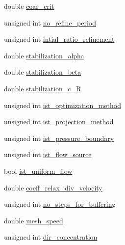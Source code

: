 \begin{DoxyCompactItemize}
\item 
double \hyperlink{struct_u_b_c__mis__mixing_1_1_parameters_aa269a4c7cf042c8ea3c2dd30d865a4dd}{coar\+\_\+crit}
\item 
unsigned int \hyperlink{struct_u_b_c__mis__mixing_1_1_parameters_a88702f3fc3a89e9e88bc06f8d5b2596f}{no\+\_\+refine\+\_\+period}
\item 
unsigned int \hyperlink{struct_u_b_c__mis__mixing_1_1_parameters_ac7af864aa24d111da0e46d45278950b0}{intial\+\_\+ratio\+\_\+refinement}
\item 
double \hyperlink{struct_u_b_c__mis__mixing_1_1_parameters_ad4e626698deb1d2d1e17d25ffade6433}{stabilization\+\_\+alpha}
\item 
double \hyperlink{struct_u_b_c__mis__mixing_1_1_parameters_aa88c59c293b2b4d7668c4ddaf48de937}{stabilization\+\_\+beta}
\item 
double \hyperlink{struct_u_b_c__mis__mixing_1_1_parameters_ab8699b436648320743f2d1601fa5fc1d}{stabilization\+\_\+c\+\_\+\+R}
\item 
unsigned int \hyperlink{struct_u_b_c__mis__mixing_1_1_parameters_ae719108e305df5ee2b950e8d058ccd89}{ist\+\_\+optimization\+\_\+method}
\item 
unsigned int \hyperlink{struct_u_b_c__mis__mixing_1_1_parameters_a621dda8ef2f8b914fc76b16da67d4869}{ist\+\_\+projection\+\_\+method}
\item 
unsigned int \hyperlink{struct_u_b_c__mis__mixing_1_1_parameters_ad7f05e11567b4ffcca1ab6d6d25e93cd}{ist\+\_\+pressure\+\_\+boundary}
\item 
unsigned int \hyperlink{struct_u_b_c__mis__mixing_1_1_parameters_a37b3342d98b8bc3b829a87981d2dc333}{ist\+\_\+flow\+\_\+source}
\item 
bool \hyperlink{struct_u_b_c__mis__mixing_1_1_parameters_a04908c7866d4e382771eef213f59ff4b}{ist\+\_\+uniform\+\_\+flow}
\item 
double \hyperlink{struct_u_b_c__mis__mixing_1_1_parameters_a856a4cd5f9549dda9bb66c0b8ac48a9e}{coeff\+\_\+relax\+\_\+div\+\_\+velocity}
\item 
unsigned int \hyperlink{struct_u_b_c__mis__mixing_1_1_parameters_aa1890b8ad18cc1099d1a5dca364908ae}{no\+\_\+steps\+\_\+for\+\_\+buffering}
\item 
double \hyperlink{struct_u_b_c__mis__mixing_1_1_parameters_a0211ea3e9c7db88805129ebd42cdceb9}{mesh\+\_\+speed}
\item 
unsigned int \hyperlink{struct_u_b_c__mis__mixing_1_1_parameters_ab32e4f6b79a7978b4439fa6407b44ea1}{dir\+\_\+concentration}
\item 

\end{DoxyCompactItemize}
